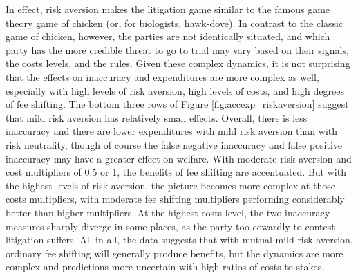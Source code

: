 \documentclass{article}
\begin{document}
In effect, risk aversion makes the litigation game similar to the famous game theory game of chicken (or, for biologists, hawk-dove). In contrast to the classic game of chicken, however, the parties are not identically situated, and which party has the more credible threat to go to trial may vary based on their signals, the costs levels, and the rules. Given these complex dynamics, it is not surprising that the effects on inaccuracy and expenditures are more complex as well, especially with high levels of risk aversion, high levels of costs, and high degrees of fee shifting. The bottom three rows of Figure \ref{fig:accexp_riskaversion} suggest that mild risk aversion has relatively small effects. Overall, there is less inaccuracy and there are lower expenditures with mild risk aversion than with risk neutrality, though of course the false negative inaccuracy and false positive inaccuracy may have a greater effect on welfare. With moderate risk aversion and cost multipliers of 0.5 or 1, the benefits of fee shifting are accentuated. But with the highest levels of risk aversion, the picture becomes more complex at those costs multipliers, with moderate fee shifting multipliers performing considerably better than higher multipliers. At the highest costs level, the two inaccuracy measures sharply diverge in some places, as the party too cowardly to contest litigation suffers.  All in all, the data suggests that with mutual mild risk aversion, ordinary fee shifting will generally produce benefits, but the dynamics are more complex and predictions more uncertain with high ratios of costs to stakes.
\end{document}
